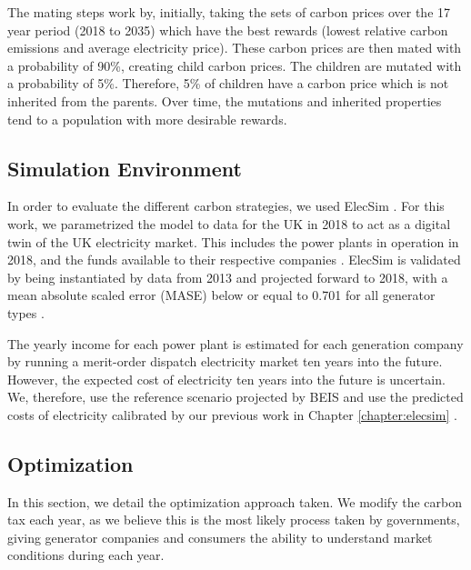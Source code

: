 The mating steps work by, initially, taking the sets of carbon prices over the 17 year period (2018 to 2035) which have the best rewards (lowest relative carbon emissions and average electricity price). These carbon prices are then mated with a probability of 90\%, creating child carbon prices. The children are mutated with a probability of 5\%. Therefore, 5\% of children have a carbon price which is not inherited from the parents. Over time, the mutations and inherited properties tend to a population with more desirable rewards.
















\subsection{Simulation Environment}
In order to evaluate the different carbon strategies, we used ElecSim \cite{Kell,Kell2020}. For this work, we parametrized the model to data for the UK in 2018 to act as a digital twin of the UK electricity market. This includes the power plants in operation in 2018, and the funds available to their respective companies \cite{dukes_511, companies_house}. ElecSim is validated by being instantiated by data from 2013 and projected forward to 2018, with a mean absolute scaled error (MASE) below or equal to 0.701 for all generator types \cite{Kell2020}. 

The yearly income for each power plant is estimated for each generation company by running a merit-order dispatch electricity market ten years into the future. However, the expected cost of electricity ten years into the future is uncertain. We, therefore, use the reference scenario projected by BEIS and use the predicted costs of electricity calibrated by our previous work in Chapter \ref{chapter:elecsim} \cite{DBEIS2019, Kell2020}. 


\subsection{Optimization}

In this section, we detail the optimization approach taken. We modify the carbon tax each year, as we believe this is the most likely process taken by governments, giving generator companies and consumers the ability to understand market conditions during each year.

